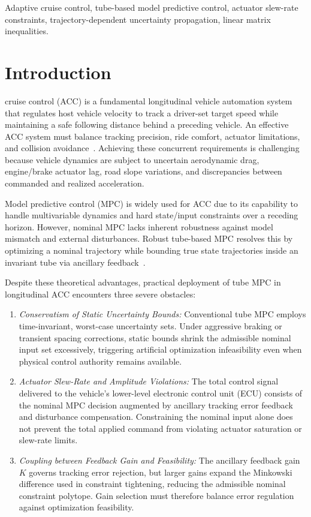 \documentclass[journal]{IEEEtran}
\begin{document}
\begin{IEEEkeywords}
Adaptive cruise control, tube-based model predictive control, actuator slew-rate constraints, trajectory-dependent uncertainty propagation, linear matrix inequalities.
\end{IEEEkeywords}

\section{Introduction}

 cruise control (ACC) is a fundamental longitudinal vehicle automation system that regulates host vehicle velocity to track a driver-set target speed while maintaining a safe following distance behind a preceding vehicle. An effective ACC system must balance tracking precision, ride comfort, actuator limitations, and collision avoidance~\cite{Mayne2005,Rakovic2012}. Achieving these concurrent requirements is challenging because vehicle dynamics are subject to uncertain aerodynamic drag, engine/brake actuator lag, road slope variations, and discrepancies between commanded and realized acceleration.

Model predictive control (MPC) is widely used for ACC due to its capability to handle multivariable dynamics and hard state/input constraints over a receding horizon. However, nominal MPC lacks inherent robustness against model mismatch and external disturbances. Robust tube-based MPC resolves this by optimizing a nominal trajectory while bounding true state trajectories inside an invariant tube via ancillary feedback~\cite{Mayne2005,Chisci2001}. 

Despite these theoretical advantages, practical deployment of tube MPC in longitudinal ACC encounters three severe obstacles:
\begin{enumerate}
    \item \emph{Conservatism of Static Uncertainty Bounds:} Conventional tube MPC employs time-invariant, worst-case uncertainty sets. Under aggressive braking or transient spacing corrections, static bounds shrink the admissible nominal input set excessively, triggering artificial optimization infeasibility even when physical control authority remains available.
    \item \emph{Actuator Slew-Rate and Amplitude Violations:} The total control signal delivered to the vehicle's lower-level electronic control unit (ECU) consists of the nominal MPC decision augmented by ancillary tracking error feedback and disturbance compensation. Constraining the nominal input alone does not prevent the total applied command from violating actuator saturation or slew-rate limits.
    \item \emph{Coupling between Feedback Gain and Feasibility:} The ancillary feedback gain $K$ governs tracking error rejection, but larger gains expand the Minkowski difference used in constraint tightening, reducing the admissible nominal constraint polytope. Gain selection must therefore balance error regulation against optimization feasibility.
\end{enumerate}
\end{document}
